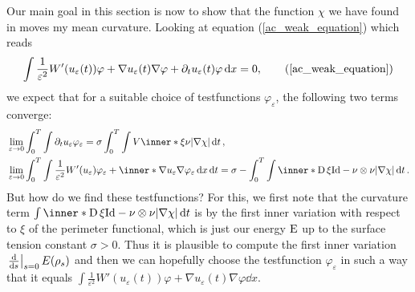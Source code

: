 Our main goal in this section is now to show that the function $ \chi $ we have found in  moves my mean curvature. Looking at equation (\ref{ac_weak_equation}) which reads
\begin{equation*}
	\int
	\frac{ 1 }{ \varepsilon^{ 2 } } W' ( u_{ \varepsilon} ( t ) ) \varphi
	+
	\nabla u_{ \varepsilon } ( t ) \nabla \varphi
	+
	\partial_{ t } u_{ \varepsilon} ( t ) \varphi 
	\dd{x}
	=
	0,
	\tag{\ref{ac_weak_equation}}
\end{equation*}
we expect that for a suitable choice of testfunctions $ \varphi_{ \varepsilon } $, the following two terms converge:
\begin{align*}
	& \lim_{ \varepsilon \to 0 }
		\int_{ 0 }^{ T }
			\int 
			\partial_{ t } u_{ \varepsilon } \varphi_{ \varepsilon }
	=
	\sigma
	\int_{ 0 }^{ T }
		\int
			V \inner*{ \xi }{ \nu }
		\abs{ \nabla \chi }
	\dd{ t },
	\\
	& \lim_{ \varepsilon \to 0 }
		\int_{ 0 }^{ T }
		\int
			\frac{1 }{ \varepsilon^{ 2 } }
			W'( u_{ \varepsilon } )
			\varphi_{ \varepsilon}
			+ 
			\inner*{ \nabla u_{ \varepsilon } }{ \nabla \varphi_{ \varepsilon } }
		\dd{ x }
		\dd{ t }
	=
	\sigma
	- \int_{ 0 }^{ T }
		\int
			\inner*{ \diff \xi }{ \mathrm{Id} - \nu \otimes \nu }
		\abs{ \nabla \chi }
	\dd{ t }.
\end{align*}
But how do we find these testfunctions? For this, we first note that the curvature term
$ \int \inner*{ \diff \xi }{ \mathrm{Id} - \nu \otimes \nu } \abs{ \nabla \chi } \dd{ t } $ is by \cite[Thm.~17.5]{maggi_sets_of_finite_perimeter} the first inner variation with respect to $ \xi $ of the perimeter functional, which is just our energy $ \operatorname{E} $ up to the surface tension constant $ \sigma > 0 $. Thus it is plausible to compute the first inner variation 
$ \left.\dv{ s } \right|_{ s = 0 } E ( \rho_{ s } ) $ and then we can hopefully choose the testfunction $ \varphi_{ \varepsilon } $ in such a way that it equals
$ 
\int
\frac{ 1 }{ \varepsilon^{ 2 } } W' ( u_{ \varepsilon} ( t ) ) \varphi
+
\nabla u_{ \varepsilon } ( t ) \nabla \varphi
\dd{x}
$.

